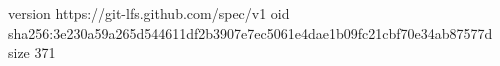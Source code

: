 version https://git-lfs.github.com/spec/v1
oid sha256:3e230a59a265d544611df2b3907e7ec5061e4dae1b09fc21cbf70e34ab87577d
size 371
